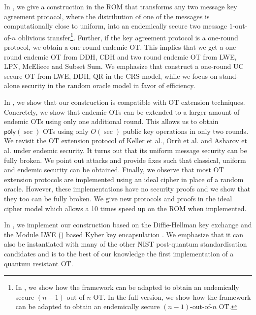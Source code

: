 In , we give a construction in the ROM that transforms any two message key agreement protocol, where the distribution of one of the messages is computationally close to uniform, into an endemically secure two message $1$-out-of-$n$ oblivious transfer\footnote{
\iffullversion 
In , we show how the framework can be adapted to obtain an endemically secure $(n-1)$-out-of-$n$ OT.
\else 
In the full version, we show how the framework can be adapted to obtain an endemically secure $(n-1)$-out-of-$n$ OT.
\fi
}. Further, 
if the key agreement protocol is a one-round protocol, we obtain a one-round endemic OT. This implies that we get a one-round endemic OT from DDH, CDH and two round endemic OT from LWE, LPN, McEliece and Subset Sum. We emphasize that \cite{TCC:GarIshSri18} construct a one-round UC secure OT from LWE, DDH, QR in the CRS model, while we focus on stand-alone security in the random oracle model in favor of efficiency.

In , we show that our construction is compatible with OT extension techniques. Concretely, we show that endemic OTs can be extended to a larger amount of endemic OTs using only one additional round. This allows us to obtain $\mathsf{poly}(\sec)$ OTs using only $O(\sec)$ public key operations in only two rounds. We revisit the OT extension protocol of Keller et al., Orr{\`u} et al. and Asharov et al. \cite{C:KelOrsSch15,RSA:OrrOrsSch17,JC:ALSZ17} under endemic security. It turns out that its uniform message security can be fully broken. We point out attacks and provide fixes such that classical, uniform and endemic security can be obtained. Finally, we observe that most OT extension protocols are implemented \cite{libOTe,KOS,EMP} using an ideal cipher in place of a random oracle. However, these implementations have no security proofs and we show that they too can be fully broken. We give new protocols and proofs in the ideal cipher model which allows a 10 times speed up on the ROM when implemented.  

In , we implement our construction based on the Diffie-Hellman key exchange and the Module LWE (\MLWE) based Kyber key encapsulation \cite{NISTPQC-R1:CRYSTALS-KYBER17}. We emphasize that it can also be instantiated with many of the other NIST post-quantum standardisation candidates and is to the best of our knowledge the first implementation of a quantum resistant OT.


